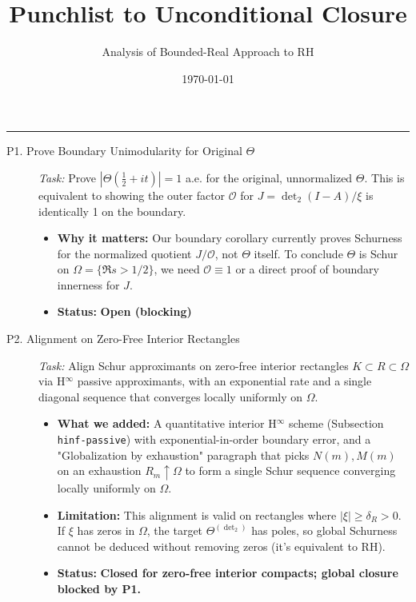\documentclass[11pt, a4paper]{article}
\newcommand{\status}[2]{\textcolor{#1}{\textbf{#2}}}
\newcommand{\dettwo}{\operatorname{det}_2}
\begin{document}
\title{\textbf{Punchlist to Unconditional Closure}}
\author{Analysis of Bounded-Real Approach to RH}
\date{\today}
\maketitle

\begin{center}
\rule{0.8\textwidth}{0.4pt}
\end{center}


\begin{description}
    \item[P1. Prove Boundary Unimodularity for Original $\Theta$]
    \textit{Task:} Prove $|\Theta(\frac{1}{2}+it)| = 1$ a.e. for the original, unnormalized $\Theta$. This is equivalent to showing the outer factor $\mathcal{O}$ for $J = \dettwo(I-A)/\xi$ is identically 1 on the boundary.
    \begin{itemize}[leftmargin=*, label={--}]
        \item \textbf{Why it matters:} Our boundary corollary currently proves Schurness for the normalized quotient $J/\mathcal{O}$, not $\Theta$ itself. To conclude $\Theta$ is Schur on $\Omega = \{\Re s > 1/2\}$, we need $\mathcal{O} \equiv 1$ or a direct proof of boundary innerness for $J$.
        \item \textbf{Status:} \status{red!80!black}{Open (blocking)}
    \end{itemize}

    \item[P2. Alignment on Zero-Free Interior Rectangles]
    \textit{Task:} Align Schur approximants on zero-free interior rectangles $K \subset R \subset \Omega$ via H$^\infty$ passive approximants, with an exponential rate and a single diagonal sequence that converges locally uniformly on $\Omega$.
    \begin{itemize}[leftmargin=*, label={--}]
        \item \textbf{What we added:} A quantitative interior H$^\infty$ scheme (Subsection \texttt{hinf-passive}) with exponential-in-order boundary error, and a "Globalization by exhaustion" paragraph that picks $N(m), M(m)$ on an exhaustion $R_m \uparrow \Omega$ to form a single Schur sequence converging locally uniformly on $\Omega$.
        \item \textbf{Limitation:} This alignment is valid on rectangles where $|\xi| \ge \delta_R > 0$. If $\xi$ has zeros in $\Omega$, the target $\Theta^{(\dettwo)}$ has poles, so global Schurness cannot be deduced without removing zeros (it’s equivalent to RH).
        \item \textbf{Status:} \status{green!60!black}{Closed for zero-free interior compacts; global closure blocked by P1.}
    \end{itemize}


\end{description}
\end{document}
